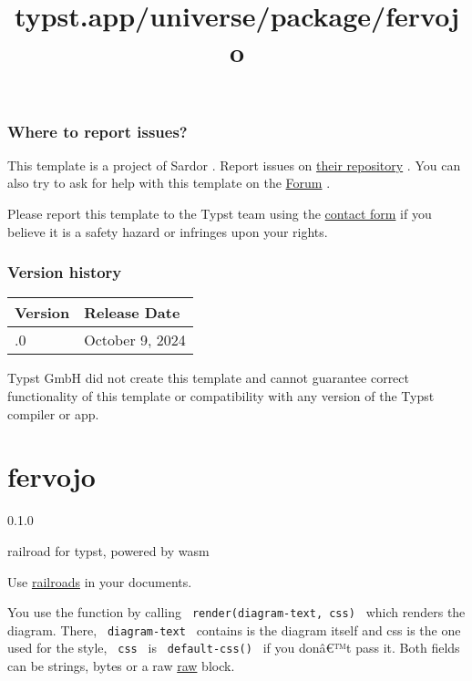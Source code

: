 \subsubsection{Where to report issues?}\label{where-to-report-issues}

This template is a project of Sardor . Report issues on
\href{https://github.com/sardorml/vantage-typst}{their repository} . You
can also try to ask for help with this template on the
\href{https://forum.typst.app}{Forum} .

Please report this template to the Typst team using the
\href{https://typst.app/contact}{contact form} if you believe it is a
safety hazard or infringes upon your rights.

\label{versions}
\subsubsection{Version history}\label{version-history}

\begin{longtable}[]{@{}ll@{}}
\toprule\noalign{}
Version & Release Date \\
\midrule\noalign{}
\endhead
\bottomrule\noalign{}
\endlastfoot
1.0.0 & October 9, 2024 \\
\end{longtable}

Typst GmbH did not create this template and cannot guarantee correct
functionality of this template or compatibility with any version of the
Typst compiler or app.


\title{typst.app/universe/package/fervojo}

\label{banner}
\section{fervojo}\label{fervojo}

{ 0.1.0 }

railroad for typst, powered by wasm

\label{readme}
Use \href{https://github.com/lukaslueg/railroad_dsl}{railroads} in your
documents.

You use the function by calling \texttt{\ render(diagram-text,\ css)\ }
which renders the diagram. There, \texttt{\ diagram-text\ } contains is
the diagram itself and css is the one used for the style,
\texttt{\ css\ } is \texttt{\ default-css()\ } if you donâ€™t pass it.
Both fields can be strings, bytes or a raw
\href{https://typst.app/docs/reference/text/raw/}{raw} block.

